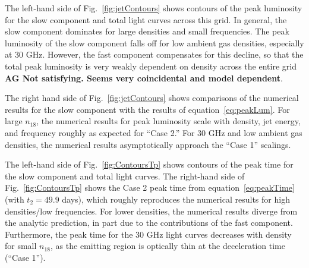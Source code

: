 \documentclass[usenatbib,fleqn]{mnras}
\begin{document}
The left-hand side of Fig.~\ref{fig:jetContours} shows contours of the
peak luminosity for the slow component and total light curves across
this grid. In general, the slow component dominates for large
densities and small frequencies.  The peak luminosity of the slow
component falls off for low ambient gas densities, especially at 30
GHz. However, the fast component compensates for this decline, so that
the total peak luminosity is very weakly dependent on density across
the entire grid {\bf AG Not satisfying. Seems very coincidental and
  model dependent}.



The right hand side of Fig.~\ref{fig:jetContours} shows comparisons of
the numerical results for the slow component with the results of
equation~\eqref{eq:peakLum}. For large $n_{18}$, the numerical results for
peak luminosity scale with density, jet energy, and frequency roughly
as expected for ``Case 2.'' For 30 GHz and low ambient gas densities,
the numerical results asymptotically approach the ``Case 1'' scalings.

The left-hand side of Fig.~\ref{fig:ContoursTp} shows contours of the
peak time for the slow component and total light curves. The
right-hand side of Fig.~\ref{fig:ContoursTp} shows the Case 2 peak
time from equation~\eqref{eq:peakTime} (with $t_2=49.9$ days), which
roughly reproduces the numerical results for high densities/low
frequencies. For lower densities, the numerical results diverge from
the analytic prediction, in part due to the contributions of the fast
component.  Furthermore, the peak time for the 30 GHz light curves
decreases with density for small $n_{18}$, as the emitting region is
optically thin at the deceleration time (``Case 1'').
\end{document}

